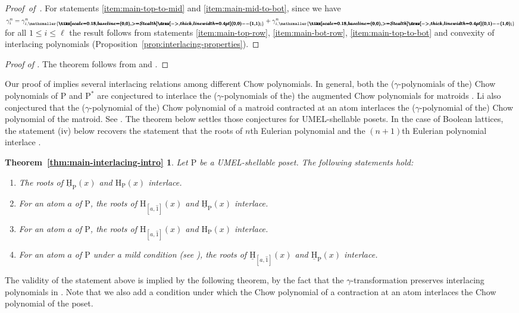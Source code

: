 \documentclass[11pt,a4paper]{amsart}
\theoremstyle{results}
\theoremstyle{definitions}
\def\P{\mathbb{P}}
\newcommand{\uH}{\underline{\mathrm{H}}}
\newcommand{\un}{\hat{1}}
\renewcommand{\P}{\mathrm{P}}
\renewcommand{\H}{\mathrm{H}}
\renewcommand{\hat}{\widehat}
\newcommand{\asce}{\mathsmaller{\pmb{\smallnearrow}}}
\newcommand{\desc}{\mathsmaller{\pmb{\smallsearrow}}}
\newcommand{\smallnearrow}{\tikz[scale=0.18, baseline={(0, 0)}, >={Stealth}]\draw[->, thick, line width=0.4pt] (0, 0) -- (1,1);}
\newcommand{\smallsearrow}{\tikz[scale=0.18, baseline={(0, 0)}, >={Stealth}]\draw[->, thick, line width=0.4pt] (0,1) -- (1,0);}
\begin{document}
\begin{proof}[Proof~of~]
For statements \ref{item:main-top-to-mid} and \ref{item:main-mid-to-bot}, since we have $\gamma^{n}_{i} = \gamma^{n}_{i, \asce} + \gamma^{n}_{i, \desc}$ for all $1 \leqslant i \leqslant \ell$ the result follows from statements \ref{item:main-top-row}, \ref{item:main-bot-row}, \ref{item:main-top-to-bot} and convexity of interlacing polynomials (Proposition~\ref{prop:interlacing-properties}).
\end{proof}

\begin{proof}[Proof of ]
    The theorem follows from  and . 
\end{proof}

Our proof of  implies several interlacing relations among different Chow polynomials. In general, both the ($\gamma$-polynomials of the) Chow polynomials of $\P$ and $\P^{\ast}$ are conjectured to interlace the ($\gamma$-polynomials of the) the augmented Chow polynomials for matroids \cite[Conjecture 5.7]{ferroni-matherne-stevens-vecchi}. Li also conjectured that the ($\gamma$-polynomial of the) Chow polynomial of a matroid contracted at an atom interlaces the ($\gamma$-polynomial of the) Chow polynomial of the matroid. See . The theorem below settles those conjectures for UMEL-shellable posets. In the case of Boolean lattices, the statement (iv) below recovers the statement that the roots of $n$th Eulerian polynomial and the $(n+1)$th Eulerian polynomial interlace \cite[Theorem 2.7]{savage2015}. 

\newtheorem*{thm:intro-interlacing}{Theorem~\ref{thm:main-interlacing-intro}}
\begin{thm:intro-interlacing}
    {\itshape 
    Let $\P$ be a UMEL-shellable poset. The following statements hold: 
    \begin{enumerate}[\normalfont(i)]
        \item The roots of $\uH_{\P}(x)$ and $\H_{\P}(x)$ interlace.
        \item For an atom $a$ of $\P$, the roots of $\H_{[a, \un]}(x)$ and $\uH_{\P}(x)$ 
        interlace. 
        \item For an atom $a$ of $\P$, the roots of $\H_{[a, \un]}(x)$ and $\H_{\P}(x)$ 
        interlace.
        \item For an atom $a$ of $\P$ under a mild condition (see ), the roots of $\uH_{[a, \un]}(x)$ and $\uH_{\P}(x)$ 
        interlace. 
    \end{enumerate}}
\end{thm:intro-interlacing}
The validity of the statement above is implied by the following theorem, by the fact that the $\gamma$-transformation preserves interlacing polynomials in . Note that we also add a condition under which the Chow polynomial of a contraction at an atom interlaces the Chow polynomial of the poset. 
\end{document}
